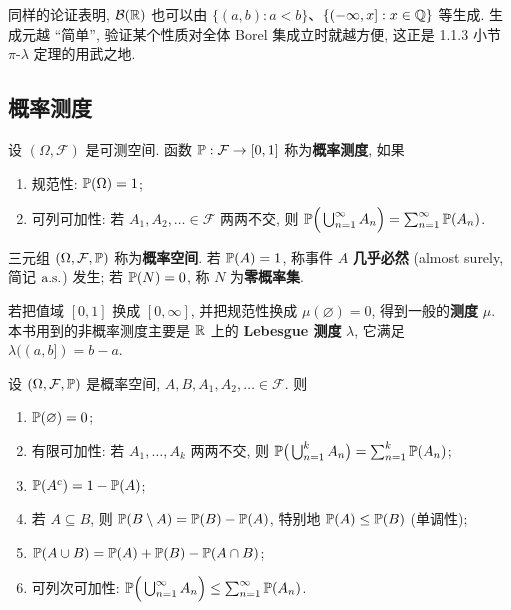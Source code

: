 \begin{remark}
同样的论证表明, $\mathcal{B}(\R)$ 也可以由 $\{(a,b): a<b\}$、$\{(-\infty,x]: x\in\Q\}$ 等生成. 生成元越 ``简单'', 验证某个性质对全体 Borel 集成立时就越方便, 这正是 1.1.3 小节 $\pi$-$\lambda$ 定理的用武之地.
\end{remark}

\subsection{概率测度}

\begin{definition}\label{def:probability}
设 $(\Omega,\mathcal{F})$ 是可测空间. 函数 $\P:\mathcal{F}\to[0,1]$ 称为\textbf{概率测度}, 如果
\begin{enumerate}
\item 规范性: $\P(\Omega)=1$;
\item 可列可加性: 若 $A_1,A_2,\dots\in\mathcal{F}$ 两两不交, 则
$\P\Big(\bigcup_{n=1}^\infty A_n\Big)=\sum_{n=1}^\infty\P(A_n)$.
\end{enumerate}
三元组 $(\Omega,\mathcal{F},\P)$ 称为\textbf{概率空间}. 若 $\P(A)=1$, 称事件 $A$ \textbf{几乎必然} (almost surely, 简记 $\as$) 发生; 若 $\P(N)=0$, 称 $N$ 为\textbf{零概率集}.
\end{definition}

\begin{remark}
若把值域 $[0,1]$ 换成 $[0,\infty]$, 并把规范性换成 $\mu(\varnothing)=0$, 得到一般的\textbf{测度} $\mu$. 本书用到的非概率测度主要是 $\R$ 上的 \textbf{Lebesgue 测度} $\lambda$, 它满足 $\lambda((a,b])=b-a$.
\end{remark}

\begin{proposition}[概率的基本性质]\label{prop:prob-basic}
设 $(\Omega,\mathcal{F},\P)$ 是概率空间, $A,B,A_1,A_2,\dots\in\mathcal{F}$. 则
\begin{enumerate}
\item $\P(\varnothing)=0$;
\item 有限可加性: 若 $A_1,\dots,A_k$ 两两不交, 则 $\P\big(\bigcup_{n=1}^k A_n\big)=\sum_{n=1}^k\P(A_n)$;
\item $\P(A^c)=1-\P(A)$;
\item 若 $A\subseteq B$, 则 $\P(B\setminus A)=\P(B)-\P(A)$, 特别地 $\P(A)\le\P(B)$ (单调性);
\item $\P(A\cup B)=\P(A)+\P(B)-\P(A\cap B)$;
\item 可列次可加性: $\P\Big(\bigcup_{n=1}^\infty A_n\Big)\le\sum_{n=1}^\infty\P(A_n)$.
\end{enumerate}
\end{proposition}

